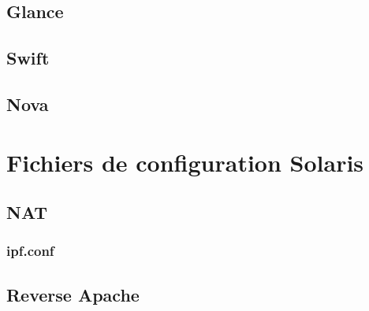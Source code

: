 \documentclass[a4paper,oneside]{report}
\begin{document}
\section{Glance} \label{conf:Glance}

\section{Swift} \label{conf:Swift}

\section{Nova} \label{conf:Nova}

\chapter{Fichiers de configuration Solaris}
\section{NAT}
\subsection{ipf.conf} \label{conf:NAT}
\section{Reverse Apache} \label{conf:apacheProxy}

\nocite{*}
\printbibliography

\printglossaries
\end{document}
